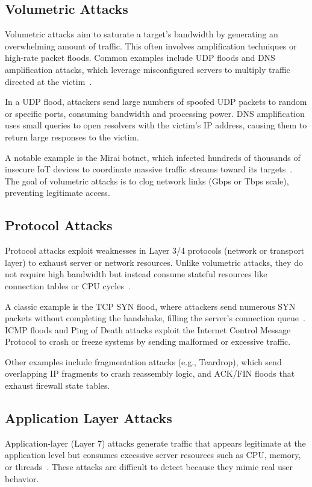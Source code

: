 \documentclass{report}
\begin{document}
\subsection{Volumetric Attacks}
Volumetric attacks aim to saturate a target’s bandwidth by generating an overwhelming amount of traffic. This often involves amplification techniques or high-rate packet floods. Common examples include UDP floods and DNS amplification attacks, which leverage misconfigured servers to multiply traffic directed at the victim~\cite{fidelis_dos}.

In a UDP flood, attackers send large numbers of spoofed UDP packets to random or specific ports, consuming bandwidth and processing power. DNS amplification uses small queries to open resolvers with the victim’s IP address, causing them to return large responses to the victim. 

A notable example is the Mirai botnet, which infected hundreds of thousands of insecure IoT devices to coordinate massive traffic streams toward its targets~\cite{fidelis_dos}. The goal of volumetric attacks is to clog network links (Gbps or Tbps scale), preventing legitimate access.

\subsection{Protocol Attacks}
Protocol attacks exploit weaknesses in Layer 3/4 protocols (network or transport layer) to exhaust server or network resources. Unlike volumetric attacks, they do not require high bandwidth but instead consume stateful resources like connection tables or CPU cycles~\cite{fidelis_dos}.

A classic example is the TCP SYN flood, where attackers send numerous SYN packets without completing the handshake, filling the server’s connection queue~\cite{imperva_dos}. ICMP floods and Ping of Death attacks exploit the Internet Control Message Protocol to crash or freeze systems by sending malformed or excessive traffic.

Other examples include fragmentation attacks (e.g., Teardrop), which send overlapping IP fragments to crash reassembly logic, and ACK/FIN floods that exhaust firewall state tables.

\subsection{Application Layer Attacks}
Application-layer (Layer 7) attacks generate traffic that appears legitimate at the application level but consumes excessive server resources such as CPU, memory, or threads~\cite{fidelis_dos}. These attacks are difficult to detect because they mimic real user behavior.
\end{document}
